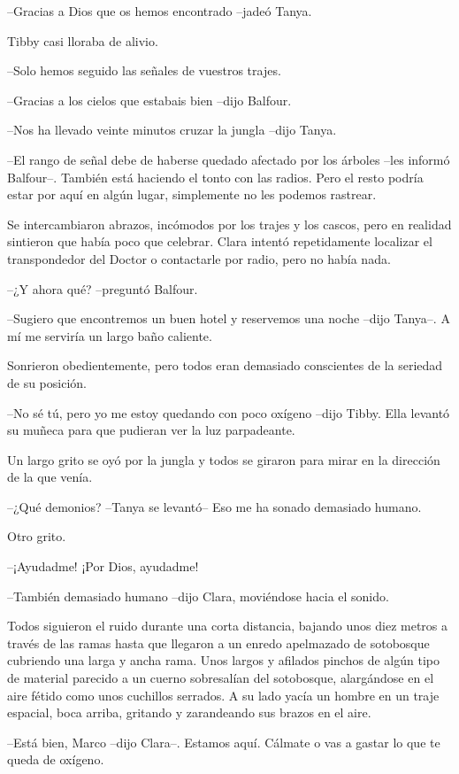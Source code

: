 {--Gracias a Dios que os hemos encontrado --jadeó Tanya.}

{Tibby casi lloraba de alivio.}

{--Solo hemos seguido las señales de vuestros trajes.}

{--Gracias a los cielos que estabais bien --dijo Balfour.}

{--Nos ha llevado veinte minutos cruzar la jungla --dijo Tanya.}

{--El rango de señal debe de haberse quedado afectado por los árboles
 --les informó Balfour--. También está haciendo el tonto con las radios.
 Pero el resto podría estar por aquí en algún lugar, simplemente no les
podemos rastrear.}

{Se intercambiaron abrazos, incómodos por los trajes y los cascos, pero
 en realidad sintieron que había poco que celebrar. Clara intentó
 repetidamente localizar el transpondedor del Doctor o contactarle por
radio, pero no había nada.}

{--¿Y ahora qué? --preguntó Balfour.}

{--Sugiero que encontremos un buen hotel y reservemos una noche --dijo
Tanya--. A mí me serviría un largo baño caliente.}

{Sonrieron obedientemente, pero todos eran demasiado conscientes de la
seriedad de su posición.}

{--No sé tú, pero yo me estoy quedando con poco oxígeno --dijo Tibby.
Ella levantó su muñeca para que pudieran ver la luz parpadeante.}

{Un largo grito se oyó por la jungla y todos se giraron para mirar en la
dirección de la que venía.}

{--¿Qué demonios? --Tanya se levantó-- Eso me ha sonado demasiado
humano.}

{Otro grito.}

{--¡Ayudadme! ¡Por Dios, ayudadme!}

{--También demasiado humano --dijo Clara, moviéndose hacia el sonido.}

{Todos siguieron el ruido durante una corta distancia, bajando unos diez
 metros a través de las ramas hasta que llegaron a un enredo apelmazado
 de sotobosque cubriendo una larga y ancha rama. Unos largos y afilados
 pinchos de algún tipo de material parecido a un cuerno sobresalían del
 sotobosque, alargándose en el aire fétido como unos cuchillos serrados.
 A su lado yacía un hombre en un traje espacial, boca arriba, gritando y
zarandeando sus brazos en el aire.}

{--Está bien, Marco --dijo Clara--. Estamos aquí. Cálmate o vas a gastar
lo que te queda de oxígeno.}

